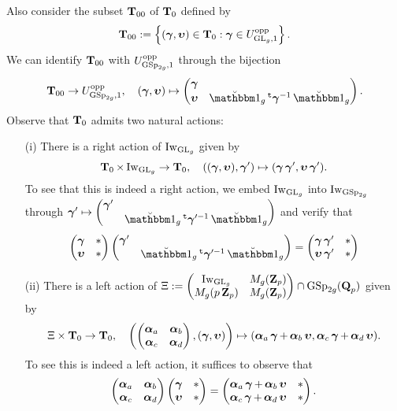 Also consider the subset $\T_{00}$ of $\T_0$ defined by $$\T_{00}:=\left\{(\bfgamma, \bfupsilon)\in \T_0: \bfgamma\in U_{\GL_g,1}^{\opp}\right\}.$$ We can identify $\T_{00}$ with $U_{\GSp_{2g}, 1}^{\opp}$ through the bijection $$\T_{00}\rightarrow U_{\GSp_{2g}, 1}^{\opp}, \quad (\bfgamma, \bfupsilon)\mapsto \begin{pmatrix}\bfgamma & \\ \bfupsilon & \oneanti_g\trans\bfgamma^{-1}\oneanti_g\end{pmatrix}.$$ Observe that $\T_0$ admits two natural actions:\begin{enumerate}
    \item[(i)] There is a right action of $\Iw_{\GL_g}$ given by $$\T_0\times \Iw_{\GL_g}\rightarrow \T_0, \quad ((\bfgamma, \bfupsilon), \bfgamma')\mapsto (\bfgamma\bfgamma', \bfupsilon\bfgamma').$$ To see that this is indeed a right action, we embed $\Iw_{\GL_g}$ into $\Iw_{\GSp_{2g}}$ through $\bfgamma'\mapsto \begin{pmatrix}\bfgamma' & \\ & \oneanti_g\trans\bfgamma'^{-1}\oneanti_g \end{pmatrix}$ and verify that 
    \[\begin{pmatrix}\bfgamma & * \\ \bfupsilon & *\end{pmatrix}\begin{pmatrix}\bfgamma' & \\  & \oneanti_g\trans\bfgamma'^{-1}\oneanti_g\end{pmatrix}=\begin{pmatrix}\bfgamma\bfgamma' & * \\ \bfupsilon\bfgamma' & *\end{pmatrix}\]
    
     \item[(ii)] There is a left action of $\Xi:=\begin{pmatrix}\Iw_{\GL_g} & M_g(\Z_p)\\ M_g(p\Z_p) & M_g(\Z_p)\end{pmatrix}\cap \GSp_{2g}(\Q_p)$ given by $$\Xi\times \T_0\rightarrow \T_0, \quad \left( \begin{pmatrix}\bfalpha_a & \bfalpha_b\\ \bfalpha_c & \bfalpha_d\end{pmatrix}, (\bfgamma, \bfupsilon)\right)\mapsto (\bfalpha_a\bfgamma+\bfalpha_b\bfupsilon, \bfalpha_c\bfgamma+\bfalpha_d\bfupsilon).$$ To see this is indeed a left action, it suffices to observe that $$\begin{pmatrix}\bfalpha_a & \bfalpha_b\\ \bfalpha_c & \bfalpha_d\end{pmatrix} \begin{pmatrix}\bfgamma & *\\ \bfupsilon & *\end{pmatrix}=\begin{pmatrix}\bfalpha_a\bfgamma+\bfalpha_b\bfupsilon & *\\ \bfalpha_c\bfgamma+\bfalpha_d\bfupsilon & *\end{pmatrix}.$$
\end{enumerate} 
